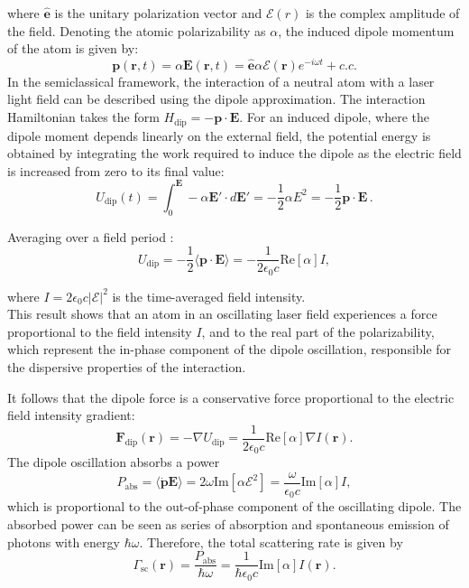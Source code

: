 where $\mathbf{\hat{e}}$ is the unitary polarization vector and $\mathcal{E}(r)$ is the complex amplitude of the field. Denoting the atomic polarizability as $\alpha$, the induced dipole momentum of the atom is given by:
\begin{equation}
    \mathbf{p}(\mathbf{r}, t) = \alpha \mathbf{E}(\mathbf{r},t) = \hat{\mathbf{e}} \alpha \mathcal{E}(\mathbf{r})e^{-i\omega t} + c.c. 
\end{equation}
In the semiclassical framework, the interaction of a neutral atom with a laser light field can be described using the dipole approximation. The interaction Hamiltonian takes the form $H_\text{dip} = - \mathbf{p \cdot E}$. For an induced dipole, where the dipole moment depends linearly on the external field, the potential energy is obtained by integrating the work required to induce the dipole as the electric field is increased from zero to its final value:
\begin{equation}
    U_\text{dip}(t) = \int_0^\mathbf{E} -\alpha \mathbf{E'}\cdot d \mathbf{E'} = -\frac{1}{2} \alpha E^2 = - \frac{1}{2} \mathbf{p \cdot E} \,. 
\end{equation}

Averaging over a field period \cite{grimm}:
\begin{equation}
    \label{eq:dipole_potential_alpha}
    U_\text{dip}= - \frac{1}{2} \langle \mathbf{p \cdot E}\rangle= -\frac{1}{2\epsilon_0 c} \text{Re}[\alpha]I,
\end{equation}

where $I=2 \epsilon_0 c |\mathcal{E}|^2$ is the time-averaged field intensity.\\
This result shows that an atom in an oscillating laser field experiences a force proportional to the field intensity $I$, and to the real part of the polarizability, which represent the in-phase component of the dipole oscillation, responsible for the dispersive properties of the interaction.

It follows that the dipole force is a conservative force proportional to the electric field intensity gradient:
\begin{equation}
    \mathbf{F}_\text{dip} (\mathbf{r}) = -\nabla U_\text{dip} = \frac{1}{2\epsilon_0 c} \text{Re}[\alpha] \nabla I(\mathbf{r}).
\end{equation}
The dipole oscillation absorbs a power
\begin{equation}
    P_\text{abs} = \langle\mathbf{\dot{p}E}\rangle = 2\omega \text{Im}[\alpha \mathcal{E}^2] = \frac{\omega}{\epsilon_0 c}\text{Im}[\alpha] I,
\end{equation}
which is proportional to the out-of-phase component of the oscillating dipole. The absorbed power can be seen as series of absorption and spontaneous emission of photons with energy $\hbar\omega$. Therefore, the total scattering rate is given by
\begin{equation}
    \label{eq:scattering_rate_alpah}
    \Gamma_\text{sc} (\mathbf{r})=\frac{P_\text{abs}}{\hbar\omega}=\frac{1}{\hbar\epsilon_0 c}\text{Im} [\alpha] I(\mathbf{r}).
\end{equation}

